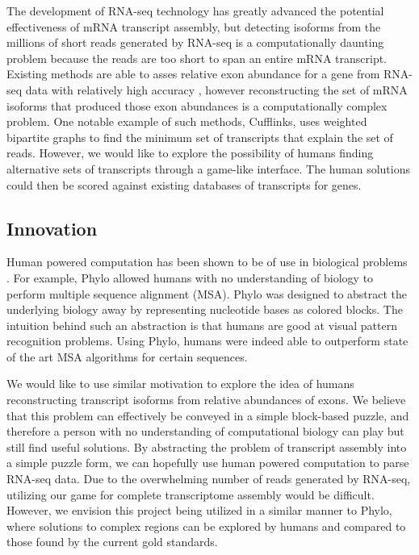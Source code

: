 \documentclass[12pt]{article}
\begin{document}
The development of RNA-seq technology has greatly advanced the potential effectiveness of mRNA transcript assembly, but detecting isoforms from the millions of short reads generated by RNA-seq is a computationally daunting problem because the reads are too short to span an entire mRNA transcript. Existing methods are able to asses relative exon abundance for a gene from RNA-seq data with relatively high accuracy \citep{trapnell2009tophat}, however reconstructing the set of mRNA isoforms that produced those exon abundances is a computationally complex problem. One notable example of such methods, Cufflinks, uses weighted bipartite graphs to find the minimum set of transcripts that explain the set of reads. However, we would like to explore the possibility of humans finding alternative sets of transcripts through a game-like interface. The human solutions could then be scored against existing databases of transcripts for genes.

\subsection*{Innovation}
Human powered computation has been shown to be of use in biological problems \citep{kawrykow2012phylo, cooper2010predicting}. For example, Phylo allowed humans with no understanding of biology to perform multiple sequence alignment (MSA). Phylo was designed to abstract the underlying biology away by representing nucleotide bases as colored blocks.  The intuition behind such an abstraction is that humans are good at visual pattern recognition problems. Using Phylo, humans were indeed able to outperform state of the art MSA algorithms for certain sequences. 

We would like to use similar motivation to explore the idea of humans reconstructing transcript isoforms from relative abundances of exons. We believe that this problem can effectively be conveyed in a simple block-based puzzle, and therefore a person with no understanding of computational biology can play but still find useful solutions. By abstracting the problem of transcript assembly into a simple puzzle form, we can hopefully use human powered computation to parse RNA-seq data. Due to the overwhelming number of reads generated by RNA-seq, utilizing our game for complete transcriptome assembly would be difficult. However, we envision this project being utilized in a similar manner to Phylo, where solutions to complex regions can be explored by humans and compared to those found by the current gold standards.
\end{document}
